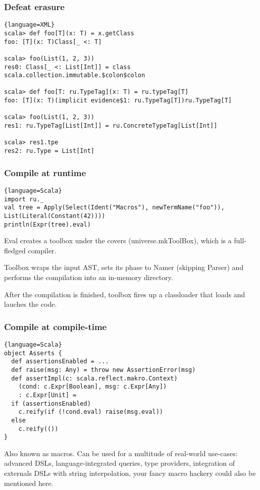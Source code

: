 \documentclass[hyperref={bookmarks=false}]{beamer}
\begin{document}
\begin{frame}[fragile]
\frametitle{Defeat erasure}

\begin{lstlisting}{language=XML}
scala> def foo[T](x: T) = x.getClass
foo: [T](x: T)Class[_ <: T]

scala> foo(List(1, 2, 3))
res0: Class[_ <: List[Int]] = class scala.collection.immutable.$colon$colon

scala> def foo[T: ru.TypeTag](x: T) = ru.typeTag[T]
foo: [T](x: T)(implicit evidence$1: ru.TypeTag[T])ru.TypeTag[T]

scala> foo(List(1, 2, 3))
res1: ru.TypeTag[List[Int]] = ru.ConcreteTypeTag[List[Int]]

scala> res1.tpe
res2: ru.Type = List[Int]
\end{lstlisting}
\end{frame}

\begin{frame}[fragile]
\frametitle{Compile at runtime}

\begin{lstlisting}{language=Scala}
import ru._
val tree = Apply(Select(Ident("Macros"), newTermName("foo")), List(Literal(Constant(42))))
println(Expr(tree).eval)
\end{lstlisting}

Eval creates a toolbox under the covers (universe.mkToolBox), which is a full-fledged compiler.

Toolbox wraps the input AST, sets its phase to Namer (skipping Parser) and performs the compilation into an in-memory directory.

After the compilation is finished, toolbox fires up a classloader that loads and lauches the code.

\end{frame}

\begin{frame}[fragile]
\frametitle{Compile at compile-time}

\begin{lstlisting}{language=Scala}
object Asserts {
  def assertionsEnabled = ...
  def raise(msg: Any) = throw new AssertionError(msg)
  def assertImpl(c: scala.reflect.makro.Context)
    (cond: c.Expr[Boolean], msg: c.Expr[Any])
    : c.Expr[Unit] =
  if (assertionsEnabled)
    c.reify(if (!cond.eval) raise(msg.eval))
  else
    c.reify(())
}
\end{lstlisting}

Also known as macros. Can be used for a multitude of real-world use-cases:
advanced DSLs, language-integrated queries, type providers, integration of externals DSLs with string interpolation,
your fancy macro hackery could also be mentioned here.

\end{frame}
\end{document}
